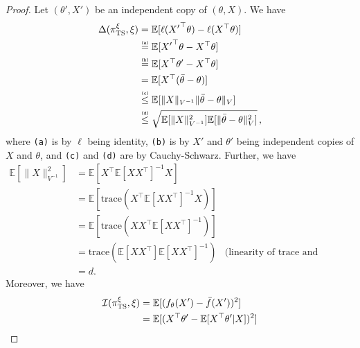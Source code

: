 \documentclass[letter, 12pt]{report}
\newcommand{\explan}[1]{\stackrel{\text{\tiny \texttt{#1}}}}
\newcommand{\E}{\mathbb E}
\newcommand{\I}{\mathcal{I}}
\newcommand{\1}{\mathbf{1}}
\newcommand{\ts}{\textsc{TS}\xspace}
\theoremstyle{plain}
\theoremstyle{definition}
\theoremstyle{remark}
\begin{document}
\begin{proof}
    Let $(\theta', X')$ be an independent copy of $(\theta, X)$.
    We have
    \begin{align*}
        \Delta(\pi^\xi_\ts, \xi)
         & =
        \E[
            \ell({X'}^\top \theta) - \ell(X^\top \theta)
        ]    \\
         &
        \explan{(a)}
        =
        \E[
            {X'}^\top \theta - X^\top \theta
        ]    \\
         &
        \explan{(b)}
        =\E[
            X^\top \theta' - X^\top \theta
        ]    \\
         &
        =\E[
            X^\top (\bar{\theta} - \theta)
        ]    \\
         &
        \explan{(c)}
        \leq
        \E[
        \|X\|_{V^{-1}} \|\bar{\theta} - \theta\|_{V}
        ]
        \\
         &
        \explan{(d)}
        \leq
        \sqrt{
        \E[\|X\|^2_{V^{-1}}]
        \E[\|\bar{\theta} - \theta\|^2_{V}]
        }\,,
    \end{align*}
    where \texttt{(a)} is by $\ell$ being identity,
    \texttt{(b)} is by $X'$ and $\theta'$ being independent copies of $X$ and $\theta$,
    and \texttt{(c)} and \texttt{(d)} are by Cauchy-Schwarz.
    Further, we have
    \begin{align*}
        \E\left[\|X\|_{V^{-1}}^2\right]
                                                    & =
        \E\left[X^\top \E[XX^\top]^{-1} X\right]                                                  \\
                                                    & =
        \E\left[\text{trace}(X^\top \E[XX^\top]^{-1} X)\right]                                    \\
                                                    & =
        \E\left[\text{trace}(X X^\top \E[XX^\top]^{-1})\right]                                    \\
                                                    & =
        \text{trace}(\E[X X^\top] \E[XX^\top]^{-1}) & \text{(linearity of trace and expectation)} \\
                                                    & =d.
    \end{align*}
    Moreover, we have
    \begin{align*}
        \I(\pi_\ts^\xi, \xi)
         & =
        \E[(f_\theta(X') - \bar{f}(X'))^2]                                  \\
         & =
        \E[(X^\top \theta' - \E[X^\top \theta'|X])^2]

\end{align*}
\end{proof}
\end{document}
